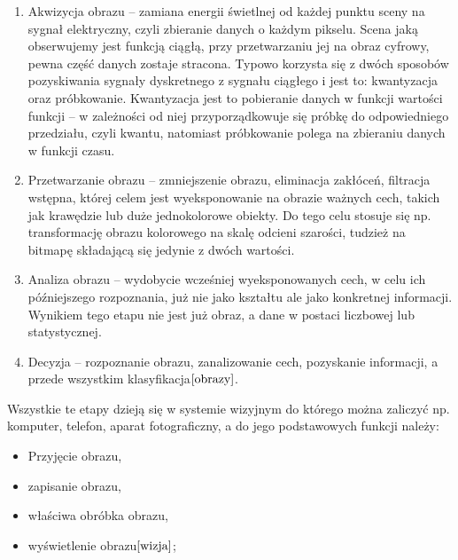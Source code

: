 \documentclass[eng,oneside]{mgr}
\begin{document}
\begin{enumerate}
\item 	Akwizycja obrazu – zamiana energii świetlnej od każdej punktu sceny na sygnał elektryczny, czyli zbieranie danych o każdym pikselu. Scena jaką obserwujemy jest funkcją ciągłą, przy przetwarzaniu jej na obraz cyfrowy, pewna część danych zostaje stracona. Typowo korzysta się z dwóch sposobów pozyskiwania sygnały dyskretnego z sygnału ciągłego i jest to: kwantyzacja oraz próbkowanie. Kwantyzacja jest to pobieranie danych w funkcji wartości funkcji – w zależności od niej przyporządkowuje się próbkę do odpowiedniego przedziału, czyli kwantu, natomiast próbkowanie polega na zbieraniu danych w funkcji czasu.
\item 	Przetwarzanie obrazu – zmniejszenie obrazu, eliminacja zakłóceń, filtracja wstępna, której celem jest wyeksponowanie na obrazie ważnych cech, takich jak krawędzie lub duże jednokolorowe obiekty. Do tego celu stosuje się np. transformację obrazu kolorowego na skalę odcieni szarości, tudzież na bitmapę składającą się jedynie z dwóch wartości.
\item 	Analiza obrazu – wydobycie wcześniej wyeksponowanych cech, w celu ich późniejszego rozpoznania, już nie jako kształtu ale jako konkretnej informacji. Wynikiem tego etapu nie jest już obraz, a dane w postaci liczbowej lub statystycznej.
\item 	Decyzja – rozpoznanie obrazu, zanalizowanie cech, pozyskanie informacji, a przede wszystkim klasyfikacja$\cite{obrazy}$.
\end{enumerate}
\hspace{1cm} Wszystkie te etapy dzieją się w systemie wizyjnym do którego można zaliczyć np. komputer, telefon, aparat fotograficzny, a do jego podstawowych funkcji należy:
\begin{itemize}
\item Przyjęcie obrazu,
\item zapisanie obrazu,
\item właściwa obróbka obrazu,
\item wyświetlenie obrazu$\cite{wizja}$;
\end{itemize}
\end{document}
